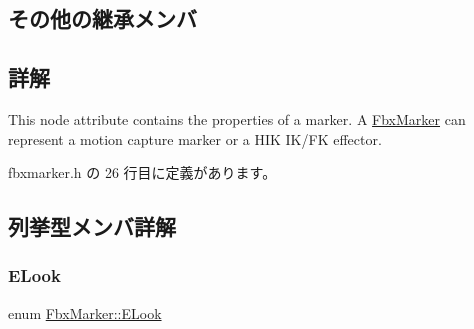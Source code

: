 \subsection*{その他の継承メンバ}


\subsection{詳解}
This node attribute contains the properties of a marker. A \hyperlink{class_fbx_marker}{Fbx\+Marker} can represent a motion capture marker or a H\+IK I\+K/\+FK effector. 

 fbxmarker.\+h の 26 行目に定義があります。



\subsection{列挙型メンバ詳解}
\mbox{\label{class_fbx_marker_a9e1fa9873c0d6da391d82d0de6a352c4}} 
\subsubsection{\texorpdfstring{E\+Look}{ELook}}
{\footnotesize\ttfamily enum \hyperlink{class_fbx_marker_a9e1fa9873c0d6da391d82d0de6a352c4}{Fbx\+Marker\+::\+E\+Look}}

